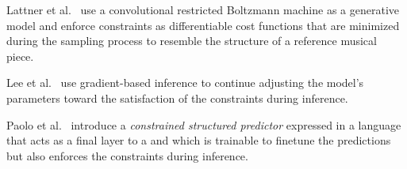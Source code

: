 \documentclass[../Document.tex]{subfiles}
\begin{document}
Lattner et al.~\cite{lattner2018imposing} use a convolutional restricted Boltzmann machine as a generative model and enforce constraints as differentiable cost functions that are minimized during the sampling process to resemble the structure of a reference musical piece.

Lee et al.~\cite{lee2019gradient} use gradient-based inference to continue adjusting the model's parameters toward the satisfaction of the constraints during inference.

Paolo et al.~\cite{DBLP:conf/nesy/DragoneTP21} introduce a \emph{constrained structured predictor} expressed in a \cp language that acts as a final layer to a \nn and which is trainable to finetune the predictions but also enforces the constraints during inference.
\end{document}
